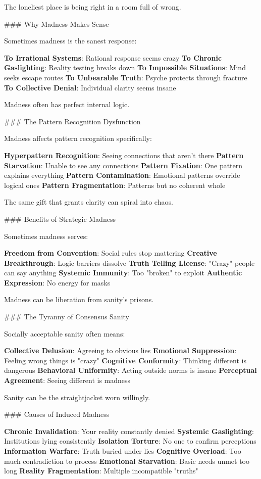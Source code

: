 \documentclass[12pt]{book}
\begin{document}
The loneliest place is being right in a room full of wrong.

\#\#\# Why Madness Makes Sense

Sometimes madness is the sanest response:

\textbf{To Irrational Systems}: Rational response seems crazy
\textbf{To Chronic Gaslighting}: Reality testing breaks down
\textbf{To Impossible Situations}: Mind seeks escape routes
\textbf{To Unbearable Truth}: Psyche protects through fracture
\textbf{To Collective Denial}: Individual clarity seems insane

Madness often has perfect internal logic.

\#\#\# The Pattern Recognition Dysfunction

Madness affects pattern recognition specifically:

\textbf{Hyperpattern Recognition}: Seeing connections that aren't there
\textbf{Pattern Starvation}: Unable to see any connections
\textbf{Pattern Fixation}: One pattern explains everything
\textbf{Pattern Contamination}: Emotional patterns override logical ones
\textbf{Pattern Fragmentation}: Patterns but no coherent whole

The same gift that grants clarity can spiral into chaos.

\#\#\# Benefits of Strategic Madness

Sometimes madness serves:

\textbf{Freedom from Convention}: Social rules stop mattering
\textbf{Creative Breakthrough}: Logic barriers dissolve
\textbf{Truth Telling License}: "Crazy" people can say anything
\textbf{Systemic Immunity}: Too "broken" to exploit
\textbf{Authentic Expression}: No energy for masks

Madness can be liberation from sanity's prisons.

\#\#\# The Tyranny of Consensus Sanity

Socially acceptable sanity often means:

\textbf{Collective Delusion}: Agreeing to obvious lies
\textbf{Emotional Suppression}: Feeling wrong things is "crazy"
\textbf{Cognitive Conformity}: Thinking different is dangerous
\textbf{Behavioral Uniformity}: Acting outside norms is insane
\textbf{Perceptual Agreement}: Seeing different is madness

Sanity can be the straightjacket worn willingly.

\#\#\# Causes of Induced Madness

\textbf{Chronic Invalidation}: Your reality constantly denied
\textbf{Systemic Gaslighting}: Institutions lying consistently
\textbf{Isolation Torture}: No one to confirm perceptions
\textbf{Information Warfare}: Truth buried under lies
\textbf{Cognitive Overload}: Too much contradiction to process
\textbf{Emotional Starvation}: Basic needs unmet too long
\textbf{Reality Fragmentation}: Multiple incompatible "truths"
\end{document}
